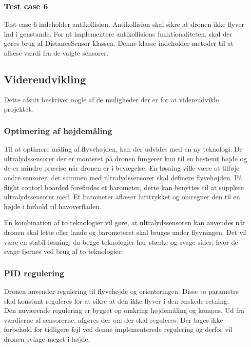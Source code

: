 \subsubsection*{Test case 6}
Test case 6 indeholder antikollision. Antikollision skal sikre at dronen ikke flyver ind i genstande. For at implementere antikollisions funktionaliteten, skal der gøres brug af DistanceSensor klassen. Denne klasse indeholder metoder til at aflæse værdi fra de valgte sensorer. 


\subsection{Videreudvikling}

Dette afsnit beskriver nogle af de muligheder der er for at videreudvikle projektet. 

\subsubsection*{Optimering af højdemåling}

Til at optimere måling af flyvehøjden, kan der udvides med en ny teknologi. De ultralydssensorer der er monteret på dronen fungerer kun til en bestemt højde og de er mindre præcise når dronen er i bevægelse. En løsning ville være at tilføje andre sensorer, der sammen med ultralydssensorer skal definere flyvehøjden. På flight contorl boarded forefindes et barometer, dette kan benyttes til at supplere ultralydssensorer med.
Et barometer aflæser lufttrykket og omregner den til en højde i forhold til havoverfladen.

En kombination af to teknologier vil gøre, at ultralydssensoren kan anvendes når dronen skal lette eller lande og barometeret skal bruges under flyvningen. Det vil være en stabil løsning, da begge teknologier har stærke og svage sider, hvor de svage fjernes ved brug af to teknologier.

\subsubsection*{PID regulering}

Dronen anvender regulering til flyvehøjde og orienteringen. Disse to parametre skal konstant reguleres for at sikre at den ikke flyver i den ønskede retning. \\
Den nuværende regulering er bygget op omkring højdemåling og kompas. Ud fra værdierne af sensorerne, afgøres der om der skal reguleres. Der tages ikke forbehold for tidligere fejl ved denne implementerede regulering og derfor vil dronen svinge meget i højde.

